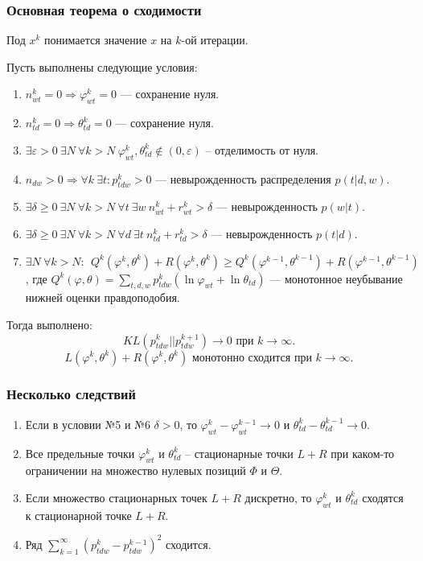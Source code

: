 \documentclass[utf8]{beamer}
\renewcommand{\geq}{\geqslant}
\renewcommand{\phi}{\varphi}
\begin{document}
\begin{frame}
\frametitle{Основная теорема о сходимости}
\footnotesize{
Под $x^k$ понимается значение $x$ на $k$-ой итерации. 

Пусть выполнены следующие условия:
\begin{enumerate}
\item  $ n^k_{wt} = 0 \Rightarrow \phi^k_{wt} = 0$ --- сохранение нуля.
\item $n^k_{td} = 0 \Rightarrow \theta^k_{td} = 0$ --- сохранение нуля.
\item $\exists \varepsilon>0\ \exists N\ \forall k > N\ \phi^k_{wt}, \theta^k_{td} \notin (0, \varepsilon)$ -- отделимость от нуля.
\item  $ n_{dw}>0 \Rightarrow \forall k\ \exists t\colon p^k_{tdw} > 0$ --- невырожденность распределения $ p(t|d,w)$.
\item $\exists \delta\geq 0\ \exists N\ \forall k > N \ \forall t\ \exists w\  n^k_{wt} + r^k_{wt} > \delta$ --- невырожденность $p(w|t)$.
\item $\exists \delta\geq 0\ \exists N\ \forall k > N \ \forall d\ \exists t\  n^k_{td} + r^k_{td} > \delta$ --- невырожденность $p(t|d)$.
\item $\exists N\ \forall k > N\colon\ \ Q^k (\phi^k, \theta^k)+ R(\phi^k, \theta^k) \geq Q^k(\phi^{k-1}, \theta^{k-1}) + R(\phi^{k-1}, \theta^{k-1})$, где $Q^k(\phi, \theta) = \sum\limits_{t,d,w} p^k_{tdw} (\ln \phi_{wt} + \ln \theta_{td})$ ---  монотонное неубывание нижней оценки правдоподобия.
\end{enumerate}
Тогда выполнено:
\[
KL(p_{tdw}^{k}||p_{tdw}^{k + 1}) \to 0 \text{ при } k \to \infty.
\]
\[
L(\phi^k, \theta^k) + R(\phi^k, \theta^k) \text{ монотонно сходится при } k \to \infty.
\]
}
\end{frame}

\begin{frame}
\frametitle{Несколько следствий}
\begin{enumerate}
\item  Если в условии №5 и №6 $\delta > 0$, то $\phi^k_{wt} - \phi_{wt}^{k-1} \to 0$ и $\theta^k_{td} - \theta^{k-1}_{td} \to 0$.
\item Все предельные точки $\phi^k_{wt}$ и $\theta^k_{td}$ -- стационарные точки $L + R$ при каком-то ограничении на множество нулевых позиций $\Phi$ и $\Theta$.
\item Если множество стационарных точек $L + R$ дискретно, то $\phi_{wt}^k$ и $\theta_{td}^k$ сходятся к стационарной точке $L+R$.
\item Ряд $\sum\limits_{k=1}^{\infty} (p_{tdw}^k - p_{tdw}^{k-1})^2$ сходится.
\end{enumerate}
\end{frame}
	
\end{document}
